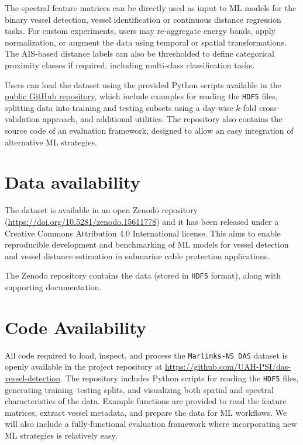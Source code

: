 \documentclass[11pt]{article}
\begin{document}
The spectral feature matrices can be directly used as input to ML models for the binary vessel detection, vessel identification or continuous distance regression tasks. For custom experiments, users may re-aggregate energy bands, apply normalization, or augment the data using temporal or spatial transformations. The AIS-based distance labels can also be thresholded to define categorical proximity classes if required, including multi-class classification tasks.

Users can load the dataset using the provided Python scripts available in the \href{https://github.com/UAH-PSI/das-vessel-detection}{public GitHub repository}, which include examples for reading the \texttt{HDF5} files, splitting data into training and testing subsets using a day-wise $k$-fold cross-validation approach, and additional utilities. The repository also contains the source code of an evaluation framework, designed to allow an easy integration of alternative ML strategies.












\section{Data availability}
\label{sec:data-availability}

The dataset is available in an open Zenodo repository~\cite{ramirez2024dasvesseldataset} (\url{https://doi.org/10.5281/zenodo.15611778}) and it has been released under a Creative Commons Attribution 4.0 International license. This aims to enable reproducible development and benchmarking of ML models for vessel detection and vessel distance estimation in submarine cable protection applications.

The Zenodo repository contains the data (stored in \texttt{HDF5} format), along with supporting documentation.


\section{Code Availability}
\label{sec:code availability}

All code required to load, inspect, and process the \texttt{Marlinks-NS DAS} dataset is openly available in the project repository at \url{https://github.com/UAH-PSI/das-vessel-detection}.
The repository includes Python scripts for reading the \texttt{HDF5} files, generating training–testing splits, and visualizing both spatial and spectral characteristics of the data. Example functions are provided to read the feature matrices, extract vessel metadata, and prepare the data for ML workflows. We will also include a fully-functional evaluation framework where incorporating new ML strategies is relatively easy.
\end{document}
